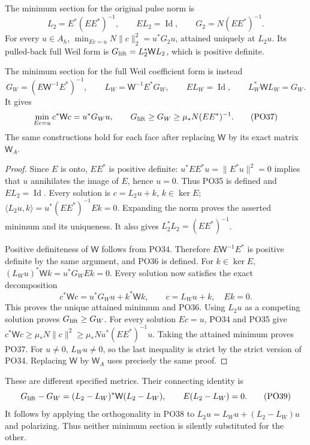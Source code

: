 \begin{theorem}\label{PO:thm:minima}
The minimum section for the original pulse norm is
\[
 L_2=E^*(EE^*)^{-1},\qquad
 EL_2=\operatorname{Id},\qquad
 G_2=N(EE^*)^{-1}.
 \tag{PO35}\label{PO:po:L2}
\]
For every \(u\in A_h\),
\(\min_{Ec=u}N\|c\|_2^2=u^*G_2u\), attained uniquely at \(L_2u\).
Its pulled-back full Weil form is
\(G_{\rm lift}=L_2^*\mathsf W L_2\), which is positive definite.

The minimum section for the full Weil coefficient form is instead
\[
 G_W=(E\mathsf W^{-1}E^*)^{-1},\qquad
 L_W=\mathsf W^{-1}E^*G_W,\qquad
 EL_W=\operatorname{Id},\qquad L_W^*\mathsf W L_W=G_W .
 \tag{PO36}\label{PO:po:LW}
\]
It gives
\[
 \min_{Ec=u}c^*\mathsf Wc=u^*G_Wu,\qquad
 G_{\rm lift}\ge G_W\ge\mu_*N(EE^*)^{-1}.
 \tag{PO37}\label{PO:po:metrics}
\]
The same constructions hold for each face after replacing
\(\mathsf W\) by its exact matrix \(\mathsf W_A\).
\end{theorem}
\begin{proof}
Since \(E\) is onto, \(EE^*\) is positive definite:
\(u^*EE^*u=\|E^*u\|^2=0\) implies that \(u\) annihilates
the image of \(E\), hence \(u=0\).
Thus PO35 is defined and \(EL_2=\operatorname{Id}\).
Every solution is \(c=L_2u+k\), \(k\in\ker E\);
\(\langle L_2u,k\rangle=u^*(EE^*)^{-1}Ek=0\).
Expanding the norm proves the asserted minimum and its uniqueness.
It also gives \(L_2^*L_2=(EE^*)^{-1}\).

Positive definiteness of \(\mathsf W\) follows from PO34.
Therefore \(E\mathsf W^{-1}E^*\) is positive definite by
the same argument, and PO36 is defined.
For \(k\in\ker E\),
\((L_Wu)^*\mathsf Wk=u^*G_WEk=0\).
Every solution now satisfies the exact decomposition
\[
 c^*\mathsf Wc
   =u^*G_Wu+k^*\mathsf Wk,\qquad c=L_Wu+k,\quad Ek=0.
 \tag{PO38}\label{PO:po:minimum-decomp}
\]
This proves the unique attained minimum and PO36.
Using \(L_2u\) as a competing solution proves
\(G_{\rm lift}\ge G_W\). For every solution \(Ec=u\),
PO34 and PO35 give
\(c^*\mathsf Wc\ge\mu_*N\|c\|^2
\ge\mu_*N u^*(EE^*)^{-1}u\).
Taking the attained minimum proves PO37.
For \(u\ne0\), \(L_Wu\ne0\), so the last inequality is
strict by the strict version of PO34.
Replacing \(\mathsf W\) by \(\mathsf W_A\) uses precisely
the same proof.
\end{proof}

These are different specified metrics. Their connecting identity is
\[
 G_{\rm lift}-G_W
  =(L_2-L_W)^*\mathsf W(L_2-L_W),\qquad
 E(L_2-L_W)=0 .
 \tag{PO39}\label{PO:po:metric-difference}
\]
It follows by applying the orthogonality in PO38 to
\(L_2u=L_Wu+(L_2-L_W)u\) and polarizing.
Thus neither minimum section is silently substituted for the other.

